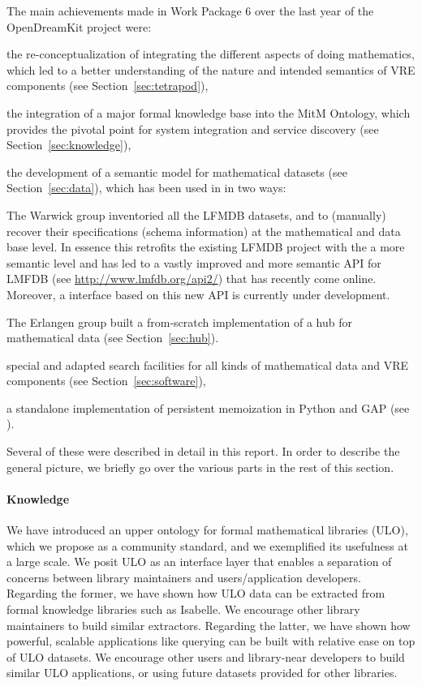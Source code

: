 The main achievements made in Work Package 6 over the last year of the OpenDreamKit project were:
\begin{compactenum}
\item the re-conceptualization of integrating the different aspects of doing mathematics, which led to a better understanding of the nature and intended semantics of VRE components (see Section~\ref{sec:tetrapod}),
\item the integration of a major formal knowledge base into the MitM Ontology, which provides the pivotal point for system integration and service discovery (see Section~\ref{sec:knowledge}),
\item the development of a semantic model for mathematical datasets (see Section~\ref{sec:data}), which has been used in  in two ways: 
  \begin{compactitem}
  \item The Warwick group inventoried all the LFMDB datasets, and to (manually) recover their specifications (schema information) at the mathematical and data base level.
    In essence this retrofits the existing LFMDB project with the a more semantic level and has led to a vastly improved and more semantic API for LMFDB (see \url{http://www.lmfdb.org/api2/}) that has recently come online.
    Moreover, a \Sage interface based on this new API is currently under development.
  \item The Erlangen group built a from-scratch implementation of a hub for mathematical data (see Section~\ref{sec:hub}).
  \end{compactitem}
\item special and adapted search facilities for all kinds of mathematical data and VRE components (see Section~\ref{sec:software}),
\item a standalone implementation of persistent memoization in Python and GAP (see ).
\end{compactenum}
Several of these were described in detail in this report.
In order to describe the general picture, we briefly go over the various parts in the rest of this section.

\paragraph{Knowledge}
We have introduced an upper ontology for formal mathematical libraries (ULO), which we propose as a community standard, and we exemplified its usefulness at a large scale.
We posit ULO as an interface layer that enables a separation of concerns between library maintainers and users/application developers.
Regarding the former, we have shown how ULO data can be extracted from formal knowledge libraries such as Isabelle.
We encourage other library maintainers to build similar extractors.
Regarding the latter, we have shown how powerful, scalable applications like querying can be built with relative ease on top of ULO datasets.
We encourage other users and library-near developers to build similar ULO applications, or using future datasets provided for other libraries.


